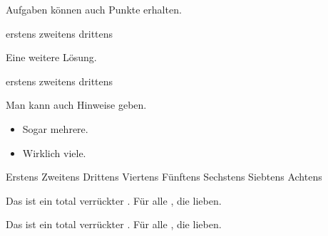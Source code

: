 \documentclass[a4paper]{scrartcl}
\begin{document}
    \begin{aufgabe}
        Aufgaben können auch Punkte erhalten.
        \begin{teilaufgaben}
            \teilaufgabe[5] erstens
            \teilaufgabe[10] zweitens
            \teilaufgabe[15] drittens
        \end{teilaufgaben}
        \begin{loesung}
            Eine weitere Lösung.
            \begin{teilaufgaben}
                \teilaufgabe erstens
                \teilaufgabe zweitens
                \teilaufgabe drittens
            \end{teilaufgaben}
        \end{loesung}
        \begin{bearbeitungshinweis}
            Man kann auch Hinweise geben.
            \begin{itemize}
                \item Sogar mehrere.
                \item Wirklich viele.
            \end{itemize}
        \end{bearbeitungshinweis}
    \end{aufgabe}

    \begin{aufgabe}[subtitle=Eine Kreuzchenaufgabe,symbol=\symHaken]
        \begin{mcumgebung} %
            \choice Erstens
            \choice Zweitens
            \choice Drittens
            \choice[\mcrichtig] Viertens
            \choice Fünftens
            \choice[\mcrichtig] Sechstens
            \choice Siebtens
            \choice[\mcrichtig] Achtens
        \end{mcumgebung}
        \begin{loesung}
            \mcloesung
        \end{loesung}
    \end{aufgabe}

    \begin{aufgabe}[symbol=\symBleistift,subtitle={Lückentext}]
        Das ist ein total verrückter . Für alle , die  lieben.
        \begin{loesung}
            Das ist ein total verrückter . Für alle , die  lieben.
        \end{loesung}
    \end{aufgabe}
\end{document}
